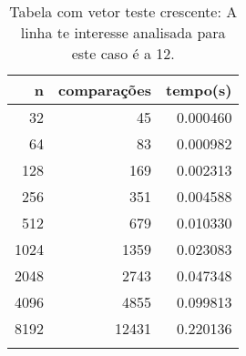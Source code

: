 \begin{table}[ht]
\centering
\begin{tabular}{rrr} \toprule
        n &    comparações &       tempo(s) \\ \midrule
      32  &             45 &      0.000460 \\
      64  &             83 &      0.000982 \\
     128  &            169 &      0.002313 \\
     256  &            351 &      0.004588 \\
     512  &            679 &      0.010330 \\
    1024  &           1359 &      0.023083 \\
    2048  &           2743 &      0.047348 \\
    4096  &           4855 &      0.099813 \\
    8192  &          12431 &      0.220136 \\
\bottomrule\addlinespace
\end{tabular}
\caption{Tabela com vetor teste crescente: A linha te interesse analisada para este caso é a 12.}
\label{tab:quicksortCrescente}
\end{table}
